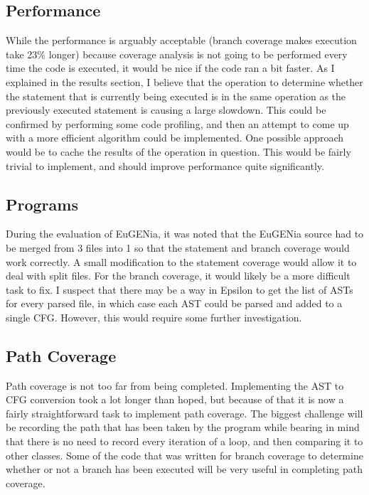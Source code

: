 \subsection{Performance}

While the performance is arguably acceptable (branch coverage makes execution take 23\% longer) because coverage analysis is not going to be performed every time the code is executed, it would be nice if the code ran a bit faster. As I explained in the results section, I believe that the operation to determine whether the statement that is currently being executed is in the same operation as the previously executed statement is causing a large slowdown. This could be confirmed by performing some code profiling, and then an attempt to come up with a more efficient algorithm could be implemented. One possible approach would be to cache the results of the operation in question. This would be fairly trivial to implement, and should improve performance quite significantly. %

\subsection{Programs}

During the evaluation of EuGENia, it was noted that the EuGENia source had to be merged from 3 files into 1 so that the statement and branch coverage would work correctly. A small modification to the statement coverage would allow it to deal with split files. For the branch coverage, it would likely be a more difficult task to fix. I suspect that there may be a way in Epsilon to get the list of ASTs for every parsed file, in which case each AST could be parsed and added to a single CFG. However, this would require some further investigation.

\subsection{Path Coverage}

Path coverage is not too far from being completed. Implementing the AST to CFG conversion took a lot longer than hoped, but because of that it is now a fairly straightforward task to implement path coverage. The biggest challenge will be recording the path that has been taken by the program while bearing in mind that there is no need to record every iteration of a loop, and then comparing it to other classes. Some of the code that was written for branch coverage to determine whether or not a branch has been executed will be very useful in completing path coverage.

